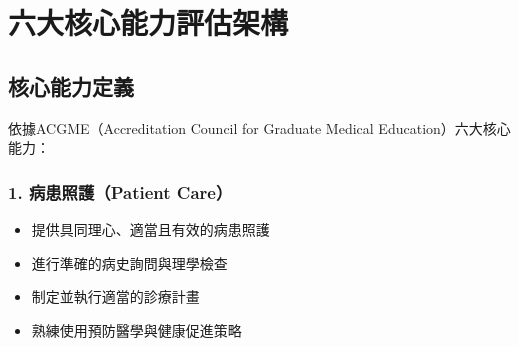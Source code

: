 \documentclass[12pt,a4paper]{article}
\begin{document}



\section{六大核心能力評估架構}
\subsection{核心能力定義}
依據ACGME（Accreditation Council for Graduate Medical Education）六大核心能力：
\subsubsection{1. 病患照護（Patient Care）}
\begin{itemize}[nosep]
    \item 提供具同理心、適當且有效的病患照護
    \item 進行準確的病史詢問與理學檢查
    \item 制定並執行適當的診療計畫
    \item 熟練使用預防醫學與健康促進策略
\end{itemize}
\end{document}
